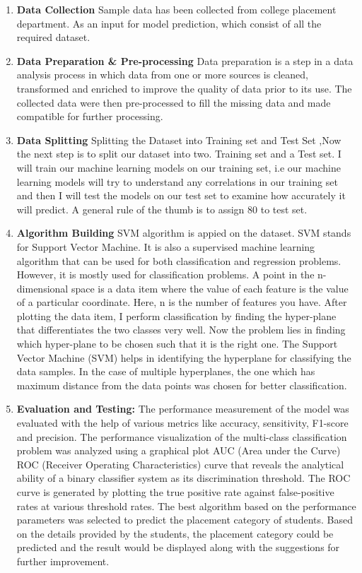 \documentclass[12pt]{article}
\begin{document}
\begin{enumerate}
  \item  \textbf{Data Collection}
	     Sample data has been collected from college placement department. As an input for model prediction, which consist of all the required dataset.
  \item \textbf{Data Preparation \& Pre-processing}
	    Data preparation is a step in a data analysis process in which data from one or more sources is cleaned, transformed and enriched to improve the quality of data prior to its use. The collected data were then pre-processed to fill the missing data 
and made compatible for further processing.
  \item \textbf{Data Splitting}
Splitting the Dataset into Training set and Test Set ,Now the next step is to split our dataset into two. Training set and a 
Test set. I will train our machine learning models on our training set, i.e our machine learning models will try to 
understand any correlations in our training set and then I will test the models on our test set to examine how accurately 
it will predict. A general rule of the thumb is to assign 80%
to test set.
  \item \textbf{Algorithm Building}
SVM algorithm is appied on the dataset. SVM stands for Support Vector Machine. It is also a supervised machine learning 
algorithm that can be used for both classification and regression problems. However, it is mostly used for classification 
problems. A point in the n-dimensional space is a data item where the value of each feature is the value of a particular 
coordinate. Here, n is the number of features you have. After plotting the data item, I perform classification by finding 
the hyper-plane that differentiates the two classes very well. Now the problem lies in finding which hyper-plane to be 
chosen such that it is the right one. The Support Vector Machine (SVM) helps in identifying the hyperplane for 
classifying the data samples. In the case of multiple hyperplanes, the one which has maximum distance from the data 
points was chosen for better classification.
  \item \textbf{Evaluation and Testing:}
The performance measurement of the model was evaluated with the help of various metrics like accuracy, sensitivity, 
F1-score and precision. The performance visualization of the multi-class classification problem was analyzed using a 
graphical plot AUC (Area under the Curve) ROC (Receiver Operating Characteristics) curve that reveals the analytical 
ability of a binary classifier system as its discrimination threshold. The ROC curve is generated by plotting the true 
positive rate against false-positive rates at various threshold rates. The best algorithm based on the performance 
parameters was selected to predict the placement category of students. Based on the details provided by the students, the 
placement category could be predicted and the result would be displayed along with the suggestions for further 
improvement.
\end{enumerate}
\end{document}
